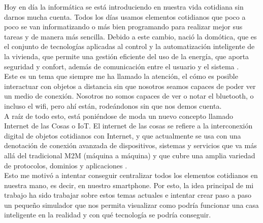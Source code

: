 
Hoy en día la informática se está introduciendo en nuestra vida cotidiana sin darnos mucha cuenta. Todos los días usamos elementos cotidianos que poco a poco se van informatizando o más bien programando para realizar mejor sus tareas y de manera más sencilla. Debido a este cambio, nació la domótica, que es el conjunto de tecnologías aplicadas al control y la automatización inteligente de la vivienda, que permite una gestión eficiente del uso de la energía, que aporta seguridad y confort, además de comunicación entre el usuario y el sistema \cite{cedom:domotica}.\\
Este es un tema que siempre me ha llamado la atención, el cómo es posible interactuar con objetos a distancia sin que nosotros seamos capaces de poder ver un medio de conexión. Nosotros no somos capaces de ver o notar el bluetooth, o incluso el wifi, pero ahí están, rodeándonos sin que nos demos cuenta.\\ A raíz de todo esto, está poniéndose de moda un nuevo concepto llamado Internet de las Cosas o IoT. El internet de las cosas se refiere a la interconexión digital de objetos cotidianos con Internet, y que actualmente se usa con una denotación de conexión avanzada de dispositivos, sistemas y servicios que va más allá del tradicional M2M (máquina a máquina) y que cubre una amplia variedad de protocolos, dominios y aplicaciones \cite{wiki:iot}.\\
Esto me motivó a intentar conseguir centralizar todos los elementos cotidianos en nuestra mano, es decir, en nuestro smartphone. Por esto, la idea principal de mi trabajo ha sido trabajar sobre estos temas actuales e intentar crear paso a paso un pequeño simulador que nos permita visualizar como podría funcionar una casa inteligente en la realidad y con qué tecnología se podría conseguir.

